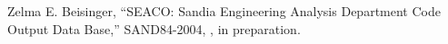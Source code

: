 Zelma E. Beisinger,
``SEACO: Sandia Engineering Analysis Department Code Output Data Base,''
SAND84-2004, \SNLA, in preparation.
